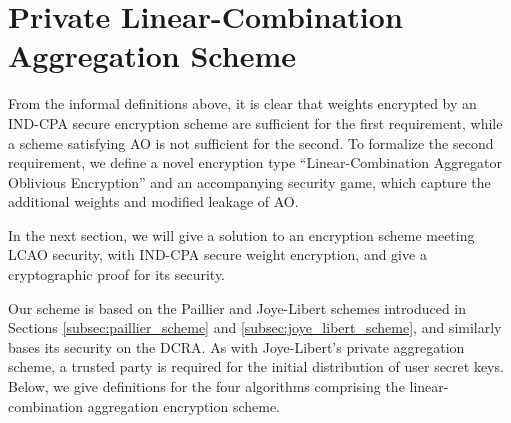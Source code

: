 \documentclass[10pt,letterpaper,oneside,twocolumn,journal]{IEEEtran}
\theoremstyle{definition}
\theoremstyle{definition}
\theoremstyle{remark}
\begin{document}
% 
%                                            
%                                            
%                                            
% 

\section{Private Linear-Combination Aggregation Scheme} \label{sec:lcao_scheme}

From the informal definitions above, it is clear that weights encrypted by an IND-CPA secure encryption scheme are sufficient for the first requirement, while a scheme satisfying AO is not sufficient for the second. To formalize the second requirement, we define a novel encryption type ``Linear-Combination Aggregator Oblivious Encryption'' and an accompanying security game, which capture the additional weights and modified leakage of AO.

In the next section, we will give a solution to an encryption scheme meeting LCAO security, with IND-CPA secure weight encryption, and give a cryptographic proof for its security.


\label{subsec:our_scheme}
Our scheme is based on the Paillier and Joye-Libert schemes introduced in Sections \ref{subsec:paillier_scheme} and \ref{subsec:joye_libert_scheme}, and similarly bases its security on the DCRA. As with Joye-Libert's private aggregation scheme, a trusted party is required for the initial distribution of user secret keys. Below, we give definitions for the four algorithms comprising the linear-combination aggregation encryption scheme.
\end{document}
